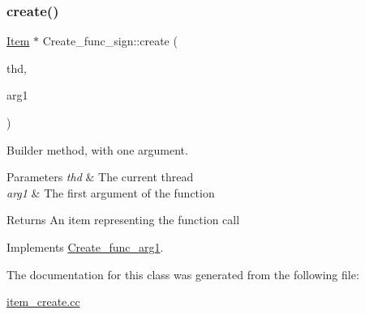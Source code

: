 \subsubsection{\texorpdfstring{create()}{create()}}
{\footnotesize\ttfamily \mbox{\hyperlink{classItem}{Item}} $\ast$ Create\+\_\+func\+\_\+sign\+::create (\begin{DoxyParamCaption}\item[{T\+HD $\ast$}]{thd,  }\item[{\mbox{\hyperlink{classItem}{Item}} $\ast$}]{arg1 }\end{DoxyParamCaption})\hspace{0.3cm}{\ttfamily [virtual]}}

Builder method, with one argument. 
\begin{DoxyParams}{Parameters}
{\em thd} & The current thread \\
\hline
{\em arg1} & The first argument of the function \\
\hline
\end{DoxyParams}
\begin{DoxyReturn}{Returns}
An item representing the function call 
\end{DoxyReturn}


Implements \mbox{\hyperlink{classCreate__func__arg1_a3e9a98f755cd82c3e762e334c955a8c9}{Create\+\_\+func\+\_\+arg1}}.



The documentation for this class was generated from the following file\+:\begin{DoxyCompactItemize}
\item 
\mbox{\hyperlink{item__create_8cc}{item\+\_\+create.\+cc}}\end{DoxyCompactItemize}
